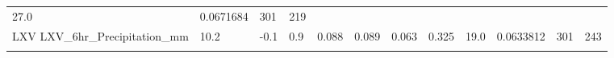 \documentclass[11pt]{article}
\begin{document}
\begin{longtable}[]{@{}llllllllllll@{}}
\begin{minipage}[t]{0.05\columnwidth}
27.0\strut
\end{minipage} & \begin{minipage}[t]{0.05\columnwidth}\raggedright\strut
0.0671684\strut
\end{minipage} & \begin{minipage}[t]{0.05\columnwidth}\raggedright\strut
301\strut
\end{minipage} & \begin{minipage}[t]{0.07\columnwidth}\raggedright\strut
219\strut
\end{minipage}\tabularnewline
\begin{minipage}[t]{0.18\columnwidth}\raggedright\strut
LXV LXV\_6hr\_Precipitation\_mm\strut
\end{minipage} & \begin{minipage}[t]{0.04\columnwidth}\raggedright\strut
10.2\strut
\end{minipage} & \begin{minipage}[t]{0.04\columnwidth}\raggedright\strut
-0.1\strut
\end{minipage} & \begin{minipage}[t]{0.04\columnwidth}\raggedright\strut
0.9\strut
\end{minipage} & \begin{minipage}[t]{0.04\columnwidth}\raggedright\strut
0.088\strut
\end{minipage} & \begin{minipage}[t]{0.05\columnwidth}\raggedright\strut
0.089\strut
\end{minipage} & \begin{minipage}[t]{0.04\columnwidth}\raggedright\strut
0.063\strut
\end{minipage} & \begin{minipage}[t]{0.04\columnwidth}\raggedright\strut
0.325\strut
\end{minipage} & \begin{minipage}[t]{0.05\columnwidth}\raggedright\strut
19.0\strut
\end{minipage} & \begin{minipage}[t]{0.05\columnwidth}\raggedright\strut
0.0633812\strut
\end{minipage} & \begin{minipage}[t]{0.05\columnwidth}\raggedright\strut
301\strut
\end{minipage} & \begin{minipage}[t]{0.07\columnwidth}\raggedright\strut
243\strut
\end{minipage}\tabularnewline
\begin{minipage}[t]{0.18\columnwidth}\raggedright\strut

\end{minipage}
\end{longtable}
\end{document}
